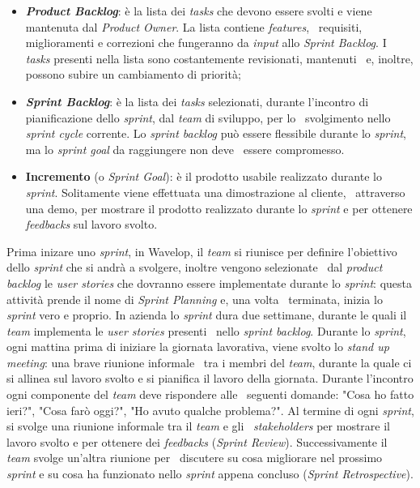 \begin{itemize}
  \item \textbf{\emph{Product Backlog}}: è la lista dei \emph{tasks} che devono essere svolti e viene mantenuta dal \emph{Product Owner}. La lista contiene \emph{features}, \
  requisiti, miglioramenti e correzioni che fungeranno da \emph{input} allo \emph{Sprint Backlog}. I \emph{tasks} presenti nella lista sono costantemente revisionati, mantenuti \
  e, inoltre, possono subire un cambiamento di priorità; 
  \item \textbf{\emph{Sprint Backlog}}: è la lista dei \emph{tasks} selezionati, durante l'incontro di pianificazione dello \emph{sprint}, dal \emph{team} di sviluppo, per lo \
  svolgimento nello \emph{sprint cycle} corrente. Lo \emph{sprint backlog} può essere flessibile durante lo \emph{sprint}, ma lo \emph{sprint goal} da raggiungere non deve \
  essere compromesso.
  \item \textbf{Incremento} (o \emph{Sprint Goal}): è il prodotto usabile realizzato durante lo \emph{sprint}. Solitamente viene effettuata una dimostrazione al cliente, \
  attraverso una demo, per mostrare il prodotto realizzato durante lo \emph{sprint} e per ottenere \emph{feedbacks} sul lavoro svolto.
\end{itemize}

Prima inizare uno \emph{sprint}, in Wavelop, il \emph{team} si riunisce per definire l'obiettivo dello \emph{sprint} che si andrà a svolgere, inoltre vengono selezionate \
dal \emph{product backlog} le \emph{user stories} che dovranno essere implementate durante lo \emph{sprint}: questa attività prende il nome di \emph{Sprint Planning} e, una volta \
terminata, inizia lo \emph{sprint} vero e proprio. In azienda lo \emph{sprint} dura due settimane, durante le quali il \emph{team} implementa le \emph{user stories} presenti \
nello \emph{sprint backlog}. Durante lo \emph{sprint}, ogni mattina prima di iniziare la giornata lavorativa, viene svolto lo \emph{stand up meeting}: una brave riunione informale \
tra i membri del \emph{team}, durante la quale ci si allinea sul lavoro svolto e si pianifica il lavoro della giornata. Durante l'incontro ogni componente del \emph{team} deve rispondere alle \
seguenti domande: "Cosa ho fatto ieri?", "Cosa farò oggi?", "Ho avuto qualche problema?". Al termine di ogni \emph{sprint}, si svolge una riunione informale tra il \emph{team} e gli \
\emph{\glspl{stakeholder}} per mostrare il lavoro svolto e per ottenere dei \emph{feedbacks} (\emph{Sprint Review}). Successivamente il \emph{team} svolge un'altra riunione per \
discutere su cosa migliorare nel prossimo \emph{sprint} e su cosa ha funzionato nello \emph{sprint} appena concluso (\emph{Sprint Retrospective}). 

